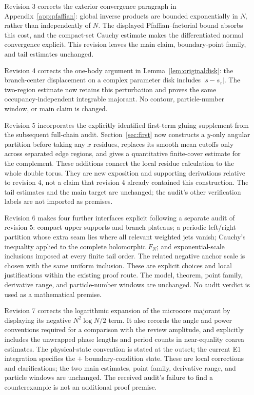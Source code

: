 \documentclass[11pt]{article}
\numberwithin{equation}{section}
\theoremstyle{definition}
\newcommand{\se}{s_\varepsilon}
\begin{document}
Revision 3 corrects the exterior convergence paragraph in
Appendix~\ref{app:pfaffian}: global inverse products are bounded
exponentially in \(N\), rather than independently of \(N\).
The displayed Pfaffian--factorial bound absorbs this cost, and
the compact-set Cauchy estimate makes the differentiated
normal convergence explicit. This revision leaves the main
claim, boundary-point family, and tail estimates unchanged.

Revision 4 corrects the one-body argument in
Lemma~\ref{lem:originaldisk}: the branch-center displacement
on a complex parameter disk includes \(|s-\se|\).
The two-region estimate now retains this perturbation and
proves the same occupancy-independent integrable majorant.
No contour, particle-number window, or main claim is changed.

Revision 5 incorporates the explicitly identified first-term gluing
supplement from the subsequent full-chain audit. Section~\ref{sec:first}
now constructs a \(y\)-only angular partition before taking any
\(x\) residues, replaces its smooth mean cutoffs only across separated
edge regions, and gives a quantitative finite-cover estimate for the
complement. These additions connect the local residue calculation to
the whole double torus. They are new exposition and supporting
derivations relative to revision 4, not a claim that revision 4 already
contained this construction. The tail estimates and the main target
are unchanged; the audit's other verification labels are not imported
as premises.

Revision 6 makes four further interfaces explicit following a
separate audit of revision 5: compact upper supports and branch
plateaus; a periodic left/right partition whose extra seam lies
where all relevant weighted jets vanish; Cauchy's inequality
applied to the complete holomorphic \(F_N\); and exponential-scale
inclusions imposed at every finite tail order. The related negative
anchor scale is chosen with the same uniform inclusion. These are
explicit choices and local justifications within the existing proof
route. The model, theorem, point family, derivative range, and
particle-number windows are unchanged. No audit verdict is used
as a mathematical premise.

Revision 7 corrects the logarithmic expansion of the microcore
majorant by displaying its negative \(N^2\log N/2\) term. It also
records the angle and power conventions required for a comparison
with the review amplitude, and explicitly includes the unwrapped
phase lengths and period counts in near-equality coarea estimates.
The physical-state convention is stated at the outset; the current
E1 integration specifies the \(+\) boundary-condition state. These are local corrections and
clarifications; the two main estimates, point family, derivative
range, and particle windows are unchanged. The received audit's
failure to find a counterexample is not an additional proof premise.
\end{document}
